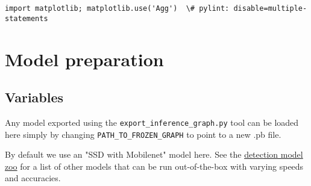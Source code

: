 \documentclass[11pt]{article}
\begin{document}
\begin{Verbatim}[commandchars=\\\{\}]
  import matplotlib; matplotlib.use('Agg')  \# pylint: disable=multiple-statements

    \end{Verbatim}

    \section{Model preparation}\label{model-preparation}

    \subsection{Variables}\label{variables}

Any model exported using the \texttt{export\_inference\_graph.py} tool
can be loaded here simply by changing \texttt{PATH\_TO\_FROZEN\_GRAPH}
to point to a new .pb file.

By default we use an "SSD with Mobilenet" model here. See the
\href{https://github.com/tensorflow/models/blob/master/research/object_detection/g3doc/detection_model_zoo.md}{detection
model zoo} for a list of other models that can be run out-of-the-box
with varying speeds and accuracies.
\end{document}
